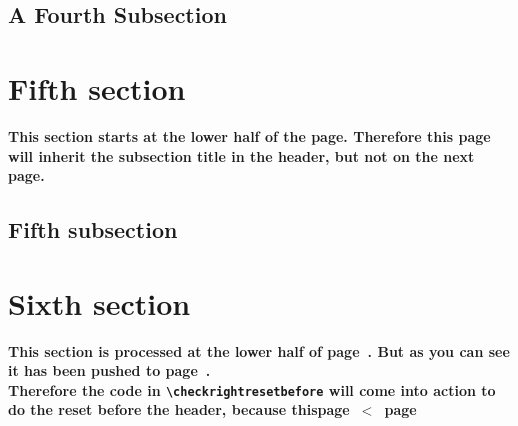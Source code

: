 \documentclass{article}
\begin{document}
\subsection{A Fourth Subsection}

\lipsum[8-11]

\section{Fifth section}

\textbf{This section starts at the lower half of the page. Therefore this page will inherit the subsection title in the header, but not on the next page.}

\medskip

\lipsum[1-7]

\subsection{Fifth subsection}

\lipsum[8-16]

\section{Sixth section}
\label{sec:push}

{\bfseries This section is processed at the lower half of  page~\thethispage. But as you can see it has been pushed to page~\pageref{sec:push}.\\
Therefore the code in \verb|\checkrightresetbefore| will come into action to do the reset before the header, because \mbox{thispage $<$ page}}

\medskip

\lipsum[1-6]

\iffalse
\subsection{Sixth subsection}

\lipsum[7]

\newpage
\section{Seventh section after a page break}

\lipsum[8]
\fi
\end{document}
